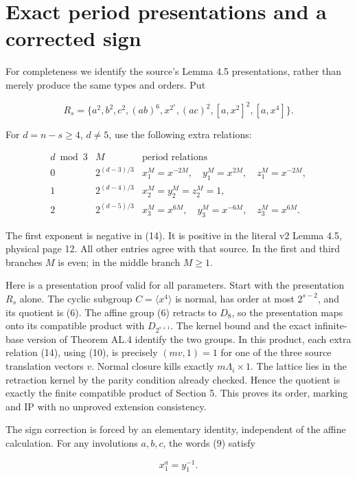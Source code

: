 \section{Exact period presentations and a corrected sign}\label{exact-period-presentations-and-a-corrected-sign}

For completeness we identify the source's Lemma 4.5 presentations,
rather than merely produce the same types and orders. Put

\[R_s=\{a^2,b^2,c^2,(ab)^6,x^{2^s},(ac)^2,
[a,x^2]^2,[a,x^4]\}.\]

For \(d=n-s\geq4\), \(d\ne5\), use the following extra relations:

\[\begin{array}{c|c|l}
d\bmod3&M&\text{period relations}\\\hline
0&2^{(d-3)/3}&x_1^M=x^{-2M},\quad y_1^M=x^{2M},\quad z_1^M=x^{-2M},\\
1&2^{(d-4)/3}&x_2^M=y_2^M=z_2^M=1,\\
2&2^{(d-5)/3}&x_3^M=x^{6M},\quad y_3^M=x^{-6M},\quad z_3^M=x^{6M}.
\end{array}\tag{14}\]

The first exponent is negative in (14). It is positive in the literal
v2 Lemma 4.5, physical page 12. All other entries agree with that
source. In the first and third branches \(M\) is even; in the middle
branch \(M\geq1\).

Here is a presentation proof valid for all parameters. Start with the
presentation \(R_s\) alone. The cyclic subgroup
\(C=\langle x^4\rangle\) is normal, has order at most \(2^{s-2}\), and
its quotient is (6). The affine group (6) retracts to \(D_8\), so the
presentation maps onto its compatible product with \(D_{2^{s+1}}\).
The kernel bound and the exact infinite-base version of Theorem AL.4
identify the two groups. In this product, each extra relation (14),
using (10), is precisely \((m v,1)=1\) for one of the three source
translation vectors \(v\). Normal closure kills exactly
\(m\Lambda_i\times1\). The lattice lies in the retraction kernel by
the parity condition already checked. Hence the quotient is exactly
the finite compatible product of Section 5. This proves its order,
marking and IP with no unproved extension consistency.

The sign correction is forced by an elementary identity, independent
of the affine calculation. For any involutions \(a,b,c\), the words (9)
satisfy

\[x_1^a=y_1^{-1}.\tag{15}\]

